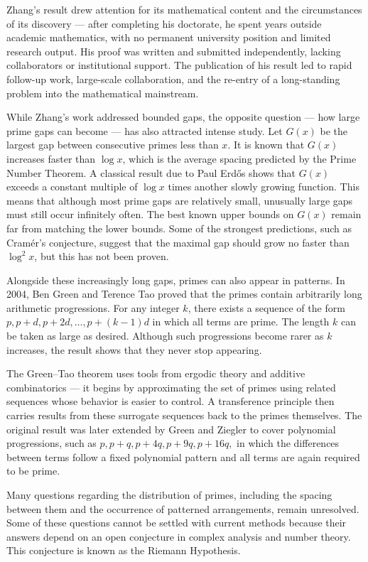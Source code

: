 Zhang's result drew attention for its mathematical content and the circumstances of its discovery — after completing his doctorate, he spent years outside academic mathematics, with no permanent university position and limited research output. His proof was written and submitted independently, lacking collaborators or institutional support. The publication of his result led to rapid follow-up work, large-scale collaboration, and the re-entry of a long-standing problem into the mathematical mainstream.

While Zhang's work addressed bounded gaps, the opposite question — how large prime gaps can become — has also attracted intense study. Let $G(x)$ be the largest gap between consecutive primes less than $x$. It is known that $G(x)$ increases faster than $\log x$, which is the average spacing predicted by the Prime Number Theorem. A classical result due to Paul Erdős shows that $G(x)$ exceeds a constant multiple of $\log x$ times another slowly growing function. This means that although most prime gaps are relatively small, unusually large gaps must still occur infinitely often. The best known upper bounds on $G(x)$ remain far from matching the lower bounds. Some of the strongest predictions, such as Cramér's conjecture, suggest that the maximal gap should grow no faster than $\log^2 x$, but this has not been proven.

Alongside these increasingly long gaps, primes can also appear in patterns. In 2004, Ben Green and Terence Tao proved that the primes contain arbitrarily long arithmetic progressions. For any integer $k$, there exists a sequence of the form $p,  p + d,  p + 2d,  \dots,  p + (k - 1)d$ in which all terms are prime. The length $k$ can be taken as large as desired. Although such progressions become rarer as $k$ increases, the result shows that they never stop appearing.

The Green–Tao theorem uses tools from ergodic theory and additive combinatorics — it begins by approximating the set of primes using related sequences whose behavior is easier to control. A transference principle then carries results from these surrogate sequences back to the primes themselves. The original result was later extended by Green and Ziegler to cover polynomial progressions, such as $p,  p + q,  p + 4q,  p + 9q,  p + 16q, $ in which the differences between terms follow a fixed polynomial pattern and all terms are again required to be prime.

Many questions regarding the distribution of primes, including the spacing between them and the occurrence of patterned arrangements, remain unresolved. Some of these questions cannot be settled with current methods because their answers depend on an open conjecture in complex analysis and number theory. This conjecture is known as the Riemann Hypothesis.

